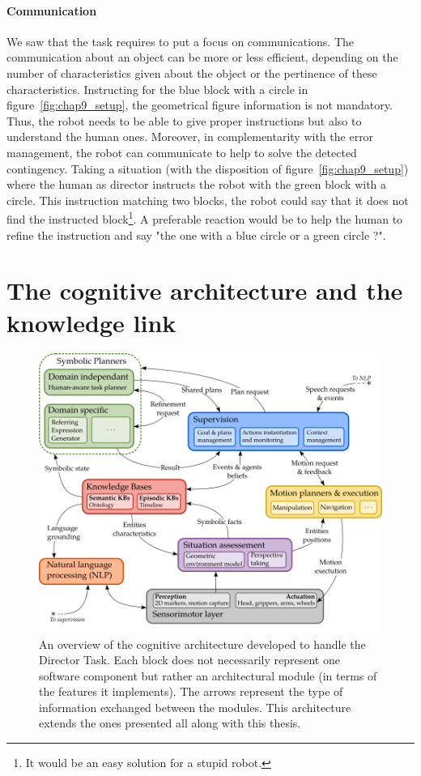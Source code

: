 \paragraph{Communication} We saw that the task requires to put a focus on communications. The communication about an object can be more or less efficient, depending on the number of characteristics given about the object or the pertinence of these characteristics. Instructing for the blue block with a circle in figure~\ref{fig:chap9_setup}, the geometrical figure information is not mandatory. Thus, the robot needs to be able to give proper instructions but also to understand the human ones. Moreover, in complementarity with the error management, the robot can communicate to help to solve the detected contingency. Taking a situation (with the disposition of figure~\ref{fig:chap9_setup}) where the human as director instructs the robot with the green block with a circle. This instruction matching two blocks, the robot could say that it does not find the instructed block\footnote{It would be an easy solution for a stupid robot.}. A preferable reaction would be to help the human to refine the instruction and say "the one with a blue circle or a green circle ?".

\section[Architecture and knowledge link]{The cognitive architecture and the knowledge link}

\begin{figure}[ht!]
\centering
\includegraphics[width=\textwidth]{figures/chapter9/architecture.png}
\caption{\label{fig:chap9_architecture} An overview of the cognitive architecture developed to handle the Director Task. Each block does not necessarily represent one software component but rather an architectural module (in terms of the features it implements). The arrows represent the type of information exchanged between the modules. This architecture extends the ones presented all along with this thesis.}
\end{figure}

